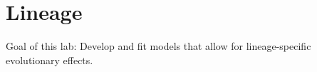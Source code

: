 \chapter{Lineage}

Goal of this lab:
Develop and fit models that allow for lineage-specific evolutionary effects.

